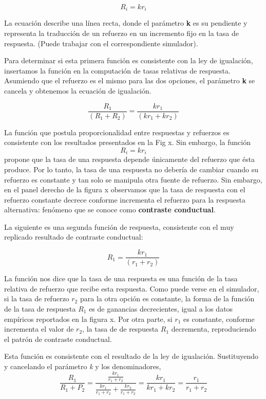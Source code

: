 \documentclass[
  a4paper,
  DIV=11,
  numbers=noendperiod]{scrreprt}
\begin{document}
\[R_i = kr_i\]

La ecuación describe una línea recta, donde el parámetro \textbf{k} es
su pendiente y representa la traducción de un refuerzo en un incremento
fijo en la tasa de respuesta. (Puede trabajar con el correspondiente
simulador).

Para determinar si esta primera función es consistente con la ley de
igualación, insertamos la función en la computación de tasas relativas
de respuesta. Asumiendo que el refuerzo es el mismo para las dos
opciones, el parámetro \textbf{k} se cancela y obtenemos la ecuación de
igualación.

\[\frac {R_1} {(R_1 + R_2)} = \frac {kr_1} {(kr_1 + kr_2)}\]

La función que postula proporcionalidad entre respuestas y refuerzos es
consistente con los resultados presentados en la Fig x. Sin embargo, la
función \[R_i = kr_i\] propone que la tasa de una respuesta depende
únicamente del refuerzo que ésta produce. Por lo tanto, la tasa de una
respuesta no debería de cambiar cuando su refuerzo es constante y tan
solo se manipula otra fuente de refuerzo. Sin embargo, en el panel
derecho de la figura x observamos que la tasa de respuesta con el
refuerzo constante decrece conforme incrementa el refuerzo para la
respuesta alternativa: fenómeno que se conoce como \textbf{contraste
conductual}.

La siguiente es una segunda función de respuesta, consistente con el muy
replicado resultado de contraste conductual:

\[R_1 = \frac {kr_1} {(r_1 + r_2)}\]

La función nos dice que la tasa de una respuesta es una función de la
tasa relativa de refuerzo que recibe esta respuesta. Como puede verse en
el simulador, si la tasa de refuerzo \(r_2\) para la otra opción es
constante, la forma de la función de la tasa de respuesta \(R_1\) es de
ganancias decrecientes, igual a los datos empíricos reportados en la
figura x. Por otra parte, si \(r_1\) es constante, conforme incrementa
el valor de \(r_2\), la tasa de de respuesta \(R_1\) decrementa,
reproduciendo el patrón de contraste conductual.

Esta función es consistente con el resultado de la ley de igualación.
Sustituyendo y cancelando el parámetro \emph{k} y los denominadores,
\begin{equation}
\frac{R_1}{R_1 + P_2} = \frac{\frac{kr_1}{r_1 + r_2}}{\frac{kr_1}{r_1 + r_2} + \frac{kr_2}{r_1 + r_2}} = \frac{kr_1}{kr_1 + kr_2} = \frac{r_1}{r_1 + r_2}
\end{equation}
\end{document}
